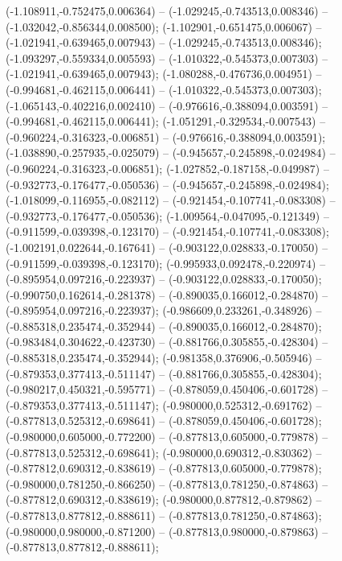  (-1.108911,-0.752475,0.006364) -- (-1.029245,-0.743513,0.008346) -- (-1.032042,-0.856344,0.008500);
 (-1.102901,-0.651475,0.006067) -- (-1.021941,-0.639465,0.007943) -- (-1.029245,-0.743513,0.008346);
 (-1.093297,-0.559334,0.005593) -- (-1.010322,-0.545373,0.007303) -- (-1.021941,-0.639465,0.007943);
 (-1.080288,-0.476736,0.004951) -- (-0.994681,-0.462115,0.006441) -- (-1.010322,-0.545373,0.007303);
 (-1.065143,-0.402216,0.002410) -- (-0.976616,-0.388094,0.003591) -- (-0.994681,-0.462115,0.006441);
 (-1.051291,-0.329534,-0.007543) -- (-0.960224,-0.316323,-0.006851) -- (-0.976616,-0.388094,0.003591);
 (-1.038890,-0.257935,-0.025079) -- (-0.945657,-0.245898,-0.024984) -- (-0.960224,-0.316323,-0.006851);
 (-1.027852,-0.187158,-0.049987) -- (-0.932773,-0.176477,-0.050536) -- (-0.945657,-0.245898,-0.024984);
 (-1.018099,-0.116955,-0.082112) -- (-0.921454,-0.107741,-0.083308) -- (-0.932773,-0.176477,-0.050536);
 (-1.009564,-0.047095,-0.121349) -- (-0.911599,-0.039398,-0.123170) -- (-0.921454,-0.107741,-0.083308);
 (-1.002191,0.022644,-0.167641) -- (-0.903122,0.028833,-0.170050) -- (-0.911599,-0.039398,-0.123170);
 (-0.995933,0.092478,-0.220974) -- (-0.895954,0.097216,-0.223937) -- (-0.903122,0.028833,-0.170050);
 (-0.990750,0.162614,-0.281378) -- (-0.890035,0.166012,-0.284870) -- (-0.895954,0.097216,-0.223937);
 (-0.986609,0.233261,-0.348926) -- (-0.885318,0.235474,-0.352944) -- (-0.890035,0.166012,-0.284870);
 (-0.983484,0.304622,-0.423730) -- (-0.881766,0.305855,-0.428304) -- (-0.885318,0.235474,-0.352944);
 (-0.981358,0.376906,-0.505946) -- (-0.879353,0.377413,-0.511147) -- (-0.881766,0.305855,-0.428304);
 (-0.980217,0.450321,-0.595771) -- (-0.878059,0.450406,-0.601728) -- (-0.879353,0.377413,-0.511147);
 (-0.980000,0.525312,-0.691762) -- (-0.877813,0.525312,-0.698641) -- (-0.878059,0.450406,-0.601728);
 (-0.980000,0.605000,-0.772200) -- (-0.877813,0.605000,-0.779878) -- (-0.877813,0.525312,-0.698641);
 (-0.980000,0.690312,-0.830362) -- (-0.877812,0.690312,-0.838619) -- (-0.877813,0.605000,-0.779878);
 (-0.980000,0.781250,-0.866250) -- (-0.877813,0.781250,-0.874863) -- (-0.877812,0.690312,-0.838619);
 (-0.980000,0.877812,-0.879862) -- (-0.877813,0.877812,-0.888611) -- (-0.877813,0.781250,-0.874863);
 (-0.980000,0.980000,-0.871200) -- (-0.877813,0.980000,-0.879863) -- (-0.877813,0.877812,-0.888611);
